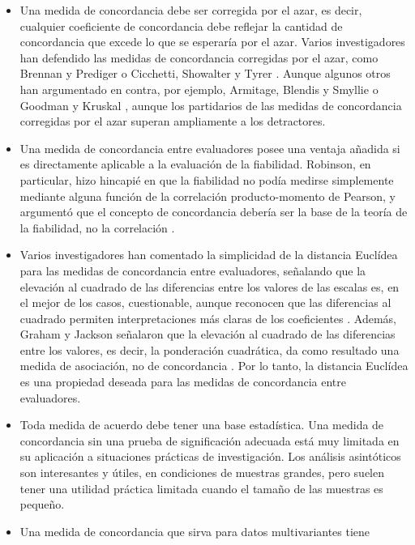 \documentclass[12pt,a4paper,]{book}
\numberwithin{dummy}{section}
\theoremstyle{ocrenumbox}
\theoremstyle{blacknumex}
\theoremstyle{blacknumbox}
\theoremstyle{ocrenum}
\theoremstyle{ocrenum}
\begin{document}
\begin{itemize}
\item
  Una medida de concordancia debe ser corregida por el azar, es decir,
  cualquier coeficiente de concordancia debe reflejar la cantidad de
  concordancia que excede lo que se esperaría por el azar. Varios
  investigadores han defendido las medidas de concordancia corregidas
  por el azar, como Brennan y Prediger \citep{Brennan1981} o Cicchetti,
  Showalter y Tyrer \citep{Cicchetti1985}. Aunque algunos otros han
  argumentado en contra, por ejemplo, Armitage, Blendis y Smyllie
  \citep{Armitage1966}o Goodman y Kruskal \citep{Goodman1954}, aunque
  los partidarios de las medidas de concordancia corregidas por el azar
  superan ampliamente a los detractores.
\item
  Una medida de concordancia entre evaluadores posee una ventaja añadida
  si es directamente aplicable a la evaluación de la fiabilidad.
  Robinson, en particular, hizo hincapié en que la fiabilidad no podía
  medirse simplemente mediante alguna función de la correlación
  producto-momento de Pearson, y argumentó que el concepto de
  concordancia debería ser la base de la teoría de la fiabilidad, no la
  correlación \citep{Robinson1957}.
\item
  Varios investigadores han comentado la simplicidad de la distancia
  Euclídea para las medidas de concordancia entre evaluadores, señalando
  que la elevación al cuadrado de las diferencias entre los valores de
  las escalas es, en el mejor de los casos, cuestionable, aunque
  reconocen que las diferencias al cuadrado permiten interpretaciones
  más claras de los coeficientes
  \citep{Fleiss1973}\citep{Krippendorff1970}. Además, Graham y Jackson
  señalaron que la elevación al cuadrado de las diferencias entre los
  valores, es decir, la ponderación cuadrática, da como resultado una
  medida de asociación, no de concordancia \citep{Graham1993}. Por lo
  tanto, la distancia Euclídea es una propiedad deseada para las medidas
  de concordancia entre evaluadores.
\item
  Toda medida de acuerdo debe tener una base estadística. Una medida de
  concordancia sin una prueba de significación adecuada está muy
  limitada en su aplicación a situaciones prácticas de investigación.
  Los análisis asintóticos son interesantes y útiles, en condiciones de
  muestras grandes, pero suelen tener una utilidad práctica limitada
  cuando el tamaño de las muestras es pequeño.
\item
  Una medida de concordancia que sirva para datos multivariantes tiene

\end{itemize}
\end{document}
